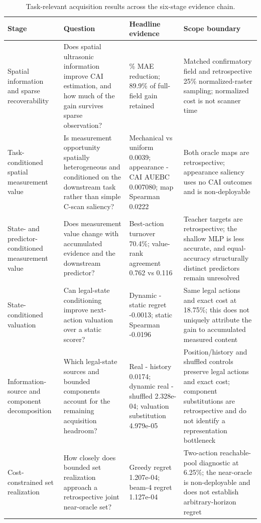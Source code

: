 \begin{table}[t]
\centering
\caption{Task-relevant acquisition results across the six-stage evidence chain.}
\label{tab:task-relevant-results}
\scriptsize
\setlength{\tabcolsep}{2.5pt}
\begin{tabularx}{\textwidth}{@{}>{\RaggedRight\arraybackslash}p{}>{\RaggedRight\arraybackslash}p{}>{\RaggedRight\arraybackslash}p{}X@{}}
\toprule
Stage & Question & Headline evidence & Scope boundary \\
\midrule
Spatial information and sparse recoverability & Does spatial ultrasonic information improve CAI estimation, and how much of the gain survives sparse observation? & 32.1\% MAE reduction; 89.9\% of full-field gain retained & Matched confirmatory field and retrospective 25\% normalized-raster sampling; normalized cost is not scanner time \\
Task-conditioned spatial measurement value & Is measurement opportunity spatially heterogeneous and conditioned on the downstream task rather than simple C-scan saliency? & Mechanical vs uniform 0.0039; appearance - CAI AUEBC 0.007080; map Spearman 0.0222 & Both oracle maps are retrospective; appearance saliency uses no CAI outcomes and is non-deployable \\
State- and predictor-conditioned measurement value & Does measurement value change with accumulated evidence and the downstream predictor? & Best-action turnover 70.4\%; value-rank agreement 0.762 vs 0.116 & Teacher targets are retrospective; the shallow MLP is less accurate, and equal-accuracy structurally distinct predictors remain unresolved \\
State-conditioned valuation & Can legal-state conditioning improve next-action valuation over a static scorer? & Dynamic - static regret -0.0013; static Spearman -0.0196 & Same legal actions and exact cost at 18.75\%; this does not uniquely attribute the gain to accumulated measured content \\
Information-source and component decomposition & Which legal-state sources and bounded components account for the remaining acquisition headroom? & Real - history 0.0174; dynamic real - shuffled 2.328e-04; valuation substitution 4.979e-05 & Position/history and shuffled controls preserve legal actions and exact cost; component substitutions are retrospective and do not identify a representation bottleneck \\
Cost-constrained set realization & How closely does bounded set realization approach a retrospective joint near-oracle set? & Greedy regret 1.207e-04; beam-4 regret 1.127e-04 & Two-action reachable-pool diagnostic at 6.25\%; the near-oracle is non-deployable and does not establish arbitrary-horizon regret \\
\bottomrule
\end{tabularx}
\end{table}
